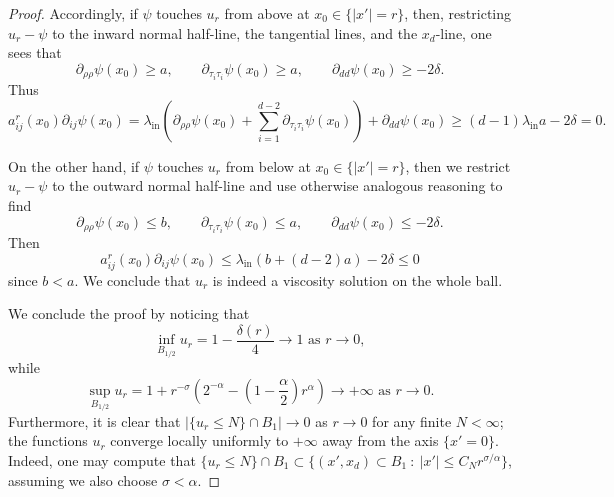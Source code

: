\documentclass[10pt,a4paper]{amsart}
\begin{document}
\begin{proof}
Accordingly, if $\psi$ touches $u_r$ from above at $x_0 \in \{|x'|=r\}$, then, restricting $u_r - \psi$ to the inward normal half-line, the tangential lines, and the $x_d$-line, one sees that
$$\partial_{\rho\rho}\psi(x_0) \ge a, \qquad \partial_{\tau_i\tau_i} \psi(x_0) \ge a, \qquad \partial_{dd} \psi(x_0) \ge - 2\delta.$$
Thus
$$a_{ij}^r(x_0)\partial_{ij}\psi(x_0) = \lambda_{\text{in}}\left(\partial_{\rho \rho}\psi(x_0) + \sum_{i=1}^{d-2} \partial_{\tau_i\tau_i}\psi(x_0)\right) + \partial_{dd}\psi(x_0) \ge (d-1)\lambda_{\text{in}}a - 2\delta =0.$$

On the other hand, if $\psi$ touches $u_r$ from below at $x_0 \in \{|x'|=r\}$, then we restrict $u_r -\psi$ to the outward normal half-line and use otherwise analogous reasoning to find 
$$\partial_{\rho\rho}\psi(x_0) \le b, \qquad \partial_{\tau_i\tau_i} \psi(x_0) \le a, \qquad \partial_{dd} \psi(x_0) \le - 2\delta.$$
Then
$$a_{ij}^r(x_0) \partial_{ij}\psi(x_0) \le \lambda_{\text{in}}(b+ (d-2)a) -2\delta \le 0$$
since $b<a$. We conclude that $u_r$ is indeed a viscosity solution on the whole ball.


We conclude the proof by noticing that
$$\inf_{B_{1/2}} u_r = 1- \frac{\delta(r)}{4} \to 1 \text{ as } r\to 0,$$
while
$$\sup_{B_{1/2}}u_r = 1 + r^{-\sigma}\left(2^{-\alpha} -\left(1-\frac\alpha2\right)r^\alpha\right) \to +\infty \text{ as } r\to 0.$$
Furthermore, it is clear that $|\{u_r \le N\} \cap B_1|\to 0$ as $r\to 0$ for any finite $N<\infty$; the functions $u_r$ converge locally uniformly to $+\infty$ away from the axis $\{x'=0\}$. Indeed, one may compute that
$\{u_r \le N\} \cap B_1 \subset \{(x',x_d)\subset B_1 \ : \ |x'| \le C_N r^{\sigma/\alpha}\}$, assuming we also choose $\sigma<\alpha$. 
\end{proof} 
\end{document}
